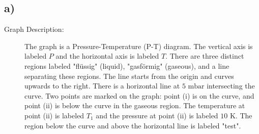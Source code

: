 

\subsection*{a)}

\begin{description}
    \item[Graph Description:] The graph is a Pressure-Temperature (P-T) diagram. The vertical axis is labeled \( P \) and the horizontal axis is labeled \( T \). There are three distinct regions labeled "flüssig" (liquid), "gasförmig" (gaseous), and a line separating these regions. The line starts from the origin and curves upwards to the right. There is a horizontal line at \( 5 \text{ mbar} \) intersecting the curve. Two points are marked on the graph: point (i) is on the curve, and point (ii) is below the curve in the gaseous region. The temperature at point (ii) is labeled \( T_1 \) and the pressure at point (ii) is labeled \( 10 \text{ K} \). The region below the curve and above the horizontal line is labeled "test".
\end{description}